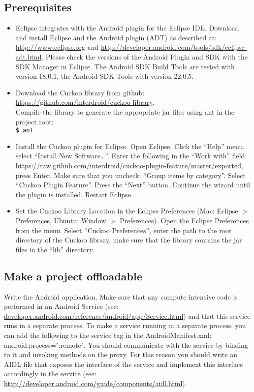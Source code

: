 \documentclass{article}
\begin{document}
\subsection{Prerequisites}
\begin{itemize}
  \item Eclipse integrates with the Android plugin for the Eclipse IDE. Download
  and install Eclipse and the Android plugin (ADT) as described at:
  \url{http://www.eclipse.org} and
  \url{http://developer.android.com/tools/sdk/eclipse-adt.html}. Please check
  the versions of the Android Plugin and SDK with the SDK Manager in Eclipse.
  The Android SDK Build Tools are tested with version 18.0.1, the Android SDK
  Tools with version 22.0.5.
  \item Download the Cuckoo library from github: \\
  \url{https://github.com/interdroid/cuckoo-library}.\\
  Compile the library to
  generate the appropriate jar files using ant in the project root: \\
  \verb!$ ant!\\
  \item Install the Cuckoo plugin for Eclipse. Open Eclipse. Click the ``Help''
  menu, select ``Install New Software\ldots''. Enter the following in the ``Work
  with'' field:
  \url{https://raw.github.com/interdroid/cuckoo-plugin-feature/master/exported}, press Enter.
  Make sure that you uncheck: ``Group items by category''. Select ``Cuckoo
  Plugin Feature''. Press the ``Next'' button. Continue the wizard until the
  plugin is installed. Restart Eclipse.
  \item Set the Cuckoo Library Location in the Eclipse Preferences (Mac:
  Eclipse $>$ Preferences, Ubuntu: Window $>$ Preferences).
  Open the Eclipse Preferences from the menu. Select ``Cuckoo Preferences'', enter the
  path to the root directory of the Cuckoo library, make sure that the library
  contains the jar files in the ``lib'' directory.
\end{itemize}

\subsection{Make a project offloadable}
Write the Android application. Make sure that any compute intensive code
is performed in an Android Service (see:
\url{developer.android.com/reference/android/app/Service.html}) and that this
service runs in a separate process. To make a service running in a separate process, you can add the following to the service tag in the AndroidManifest.xml:
android:process=":remote". You should communicate with the service by binding to
it and invoking methods on the proxy. For this reason you should write an AIDL
file that exposes the interface of the service and implement this interface
accordingly in the service (see:
\url{http://developer.android.com/guide/components/aidl.html}).
\end{document}

